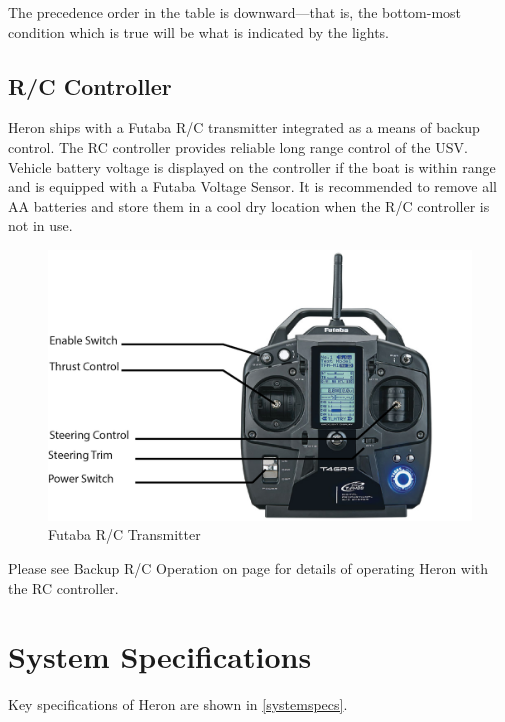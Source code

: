 \documentclass[]{clearpath-latex/clearpath-manual}
\begin{document}
The precedence order in the table is downward—that is, the bottom-most condition which is true will be what is indicated by the lights.

\newpage
\subsection{R/C Controller}
Heron ships with a Futaba R/C transmitter integrated as a means of backup control. The RC controller provides reliable long range control of the USV. Vehicle battery voltage is displayed on the controller if the boat is within range and is equipped with a Futaba Voltage Sensor.  It is recommended to remove all AA batteries and store them in a cool dry location when the R/C controller is not in use.

\begin{figure}[t]
  \centering
  \includegraphics[width=0.85\linewidth]{graphics/h-futaba.png}
  \caption{Futaba R/C Transmitter}
  \label{h_futaba}
\end{figure}

Please see Backup R/C Operation on page \pageref{backupoperation} for details of operating Heron with the RC controller.

\newpage


\section{System Specifications}
Key specifications of Heron are shown in \autoref{systemspecs}.
\end{document}

